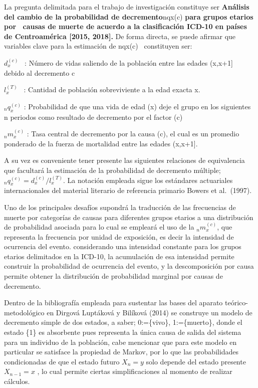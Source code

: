 \documentclass[
  letterpaper,
  DIV=11,
  numbers=noendperiod]{scrartcl}
\begin{document}
La pregunta delimitada para el trabajo de investigación constituye ser
\textbf{Análisis del cambio de la probabilidad de decremento}nqx(c)
\textbf{para grupos etarios por~ causas de muerte de acuerdo a la
clasificación ICD-10 en países de Centroamérica {[}2015, 2018{]}.} De
forma directa, se puede afirmar que variables clave para la estimación
de nqx(c)~ constituyen ser:

\(d_x^{(c)}\)~ : Número de vidas saliendo de la población entre las
edades (x,x+1{]}~ debido al decremento c~

\(l_x^{(T)}\)~ : Cantidad de población sobreviviente a la edad exacta x.

\(_nq_x^{(c)}\) : Probabilidad de que una vida de edad (x) deje el grupo
en los siguientes n periodos como resultado de decremento por el factor
(c)

\(_nm_x^{(c)}\) : Tasa central de decremento por la causa (c), el cual
es un promedio ponderado de la fuerza de mortalidad entre las edades
(x,x+1{]}.~

A su vez es conveniente tener presente las siguientes relaciones de
equivalencia que facultará la estimación de la probabilidad de
decremento múltiple; \(_nq_x^{(c)} =d_x^{(c)}/ l_x^{(T)}\). La notación
empleada sigue los estándares actuariales internacionales del material
literario de referencia primario Bowers et al.~(1997).~

Uno de los principales desafíos supondrá la traducción de las
frecuencias de muerte por categorías de causas para diferentes grupos
etarios a una distribución de probabilidad asociada para lo cual se
empleará el uso de la \(_nm_x^{(c)}\), que representa la frecuencia por
unidad de exposición, es decir la intensidad de ocurrencia del evento.
considerando una intensidad constante para los grupos etarios
delimitados en la ICD-10, la acumulación de esa intensidad permite
construir la probabilidad de ocurrencia del evento, y la descomposición
por causa permite obtener la distribución de probabilidad marginal por
causas de decremento.

Dentro de la bibliografía empleada para sustentar las bases del aparato
teórico-metodológico en Dirgová Luptáková y Bilíková (2014) se construye
un modelo de decremento simple de dos estados, a saber; 0:=\{vivo\},
1:=\{muerto\}, donde el estado \{1\} es absorbente pues representa la
única causa de salida del sistema para un individuo de la población,
cabe mencionar que para este modelo en particular se satisface la
propiedad de Markov, por lo que las probabilidades condicionadas de que
el estado futuro \(X_n=y\) solo depende del estado presente
\(X_{n-1}=x\) , lo cual permite ciertas simplificaciones al momento de
realizar cálculos.
\end{document}
